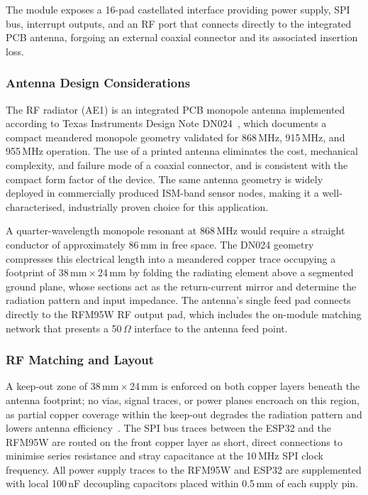 \documentclass[english,bachelor]{tfgitic}[2026/01/22]
\begin{document}
The module exposes a 16-pad castellated interface providing power supply, SPI bus,
interrupt outputs, and an RF port that connects directly
to the integrated PCB antenna, forgoing an external coaxial connector and its
associated insertion loss.

\subsubsection{Antenna Design Considerations}
\label{subsec:hw_antenna}

The RF radiator (AE1) is an integrated PCB monopole antenna implemented according
to Texas Instruments Design Note DN024~\cite{ti_dn024}, which documents a compact
meandered monopole geometry validated for 868\,MHz, 915\,MHz, and 955\,MHz
operation. The use of a printed antenna eliminates the cost, mechanical complexity,
and failure mode of a coaxial connector, and is consistent with the compact
form factor of the device. The same antenna geometry is widely deployed in
commercially produced ISM-band sensor nodes, making it a well-characterised,
industrially proven choice for this application.

A quarter-wavelength monopole resonant at 868\,MHz would require a straight conductor
of approximately 86\,mm in free space. The DN024 geometry compresses this electrical
length into a meandered copper trace occupying a footprint of 38\,mm\,$\times$\,24\,mm
by folding the radiating element above a segmented ground plane, whose sections act
as the return-current mirror and determine the radiation pattern and input impedance.
The antenna's single feed pad connects directly to the RFM95W RF output pad, which
includes the on-module matching network that presents a 50\,$\Omega$ interface to the
antenna feed point.

\subsubsection{RF Matching and Layout}
\label{subsec:hw_rf_layout}

A keep-out zone of 38\,mm\,$\times$\,24\,mm is enforced on both copper layers beneath
the antenna footprint; no vias, signal traces, or power planes encroach on this
region, as partial copper coverage within the keep-out degrades the radiation pattern
and lowers antenna efficiency~\cite{ti_dn024}. The SPI bus traces between the ESP32
and the RFM95W are routed on the front copper layer as short, direct connections
to minimise series resistance and stray capacitance at the 10\,MHz SPI clock
frequency. All power supply traces to the RFM95W and ESP32 are supplemented with
local 100\,nF decoupling capacitors placed within 0.5\,mm of each supply pin.
\end{document}
